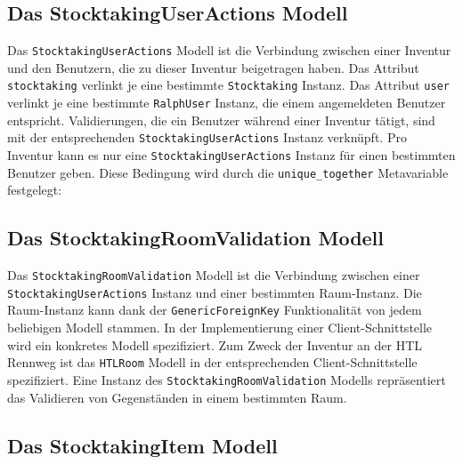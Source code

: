 \hypertarget{das-stocktakinguseractions-modell}{%
\subsection{Das StocktakingUserActions
Modell}\label{das-stocktakinguseractions-modell}}

Das \texttt{StocktakingUserActions} Modell ist die Verbindung zwischen
einer Inventur und den Benutzern, die zu dieser Inventur beigetragen
haben. Das Attribut \texttt{stocktaking} verlinkt je eine bestimmte
\texttt{Stocktaking} Instanz. Das Attribut \texttt{user} verlinkt je
eine bestimmte \texttt{RalphUser} Instanz, die einem angemeldeten
Benutzer entspricht. Validierungen, die ein Benutzer während einer
Inventur tätigt, sind mit der entsprechenden
\texttt{StocktakingUserActions} Instanz verknüpft. Pro Inventur kann es
nur eine \texttt{StocktakingUserActions} Instanz für einen bestimmten
Benutzer geben. Diese Bedingung wird durch die \texttt{unique\_together}
Metavariable \cite{django-doku-models-options} festgelegt:

\begin{Shaded}
\begin{Highlighting}[]
\OperatorTok{=}\NormalTok{ [[}\NormalTok{, }\NormalTok{]]}
\end{Highlighting}
\end{Shaded}

\hypertarget{das-stocktakingroomvalidation-modell}{%
\subsection{Das StocktakingRoomValidation
Modell}\label{das-stocktakingroomvalidation-modell}}

Das \texttt{StocktakingRoomValidation} Modell ist die Verbindung
zwischen einer \texttt{StocktakingUserActions} Instanz und einer
bestimmten Raum-Instanz. Die Raum-Instanz kann dank der
\texttt{GenericForeignKey} Funktionalität
\cite{django-doku-contenttypes} von jedem beliebigen Modell stammen. In
der Implementierung einer Client-Schnittstelle wird ein konkretes Modell
spezifiziert. Zum Zweck der Inventur an der HTL Rennweg ist das
\texttt{HTLRoom} Modell in der entsprechenden Client-Schnittstelle
spezifiziert. Eine Instanz des \texttt{StocktakingRoomValidation}
Modells repräsentiert das Validieren von Gegenständen in einem
bestimmten Raum.

\hypertarget{das-stocktakingitem-modell}{%
\subsection{Das StocktakingItem
Modell}\label{das-stocktakingitem-modell}}

